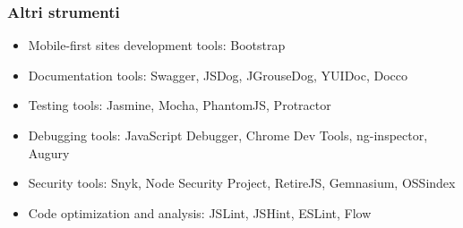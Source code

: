 \subsubsection{Altri strumenti}
\begin{itemize}
    \item Mobile-first sites development tools: Bootstrap
    \item Documentation tools: Swagger, JSDog, JGrouseDog, YUIDoc, Docco
    \item Testing tools: Jasmine, Mocha, PhantomJS, Protractor
    \item Debugging tools: JavaScript Debugger, Chrome Dev Tools, ng-inspector, Augury
    \item Security tools: Snyk, Node Security Project, RetireJS, Gemnasium, OSSindex
    \item Code optimization and analysis: JSLint, JSHint, ESLint, Flow
\end{itemize}